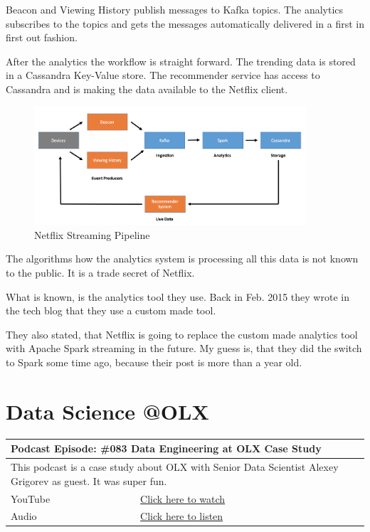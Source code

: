 \documentclass[12pt, numbers=noenddot]{scrreprt} %
\begin{document}
Beacon and Viewing History publish messages to Kafka topics. The analytics subscribes to the topics and gets the messages automatically delivered in a first in first out fashion.

After the analytics the workflow is straight forward. The trending data is stored in a Cassandra Key-Value store. The recommender service has access to Cassandra and is making the data available to the Netflix client.

\begin{figure}[htbp]
  \centering
     \includegraphics[width=0.9\textwidth]{images/Netflix-Streaming-Pipeline}
  \caption{Netflix Streaming Pipeline}
  \label{fig:Bild1}
\end{figure}


The algorithms how the analytics system is processing all this data is not known to the public. It is a trade secret of Netflix.

What is known, is the analytics tool they use. Back in Feb. 2015 they wrote in the tech blog that they use a custom made tool.

They also stated, that Netflix is going to replace the custom made analytics tool with Apache Spark streaming in the future. My guess is, that they did the switch to Spark some time ago, because their post is more than a year old.

\section{Data Science @OLX}

\begin{table}[h]
\begin{tabular}{ll}
\hline
\multicolumn{2}{l}{\textbf{Podcast Episode:} \#083 Data Engineering at OLX Case Study} \\ \hline
\multicolumn{2}{p{15cm}}{This podcast is a case study about OLX with Senior Data Scientist Alexey Grigorev as guest. It was super fun.}         \\ \hline
\multicolumn{1}{l|}{YouTube}   & \href{https://youtu.be/H_uFNoCvykM}{Click here to watch}   \\ 
\multicolumn{1}{l|}{Audio}     & \href{https://anchor.fm/andreaskayy/episodes/083-Data-Engineering-at-OLX-Case-Study-e45j5n}{Click here to listen}   \\ \hline
\end{tabular}
\end{table}
\end{document}
